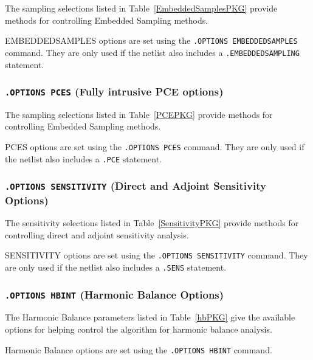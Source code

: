 The sampling selections listed in Table~\ref{EmbeddedSamplesPKG}
provide methods for controlling Embedded Sampling methods.

EMBEDDEDSAMPLES options are set using the \texttt{.OPTIONS EMBEDDEDSAMPLES}
command.  They are only used if the
netlist also includes a \texttt{.EMBEDDEDSAMPLING} statement.



\subsubsection{\texttt{.OPTIONS PCES} (Fully intrusive PCE options)}

The sampling selections listed in Table~\ref{PCEPKG}
provide methods for controlling Embedded Sampling methods.

PCES options are set using the \texttt{.OPTIONS PCES}
command.  They are only used if the
netlist also includes a \texttt{.PCE} statement.



\subsubsection{\texttt{.OPTIONS SENSITIVITY} (Direct and Adjoint Sensitivity Options)}

The sensitivity selections listed in Table~\ref{SensitivityPKG}
provide methods for controlling direct and adjoint sensitivity analysis.

SENSITIVITY options are set using the \texttt{.OPTIONS SENSITIVITY} command. 
They are only used if the netlist also includes a \texttt{.SENS} statement. 



\subsubsection{\texttt{.OPTIONS HBINT} (Harmonic Balance Options)}

The Harmonic Balance parameters listed in Table~\ref{hbPKG} give the available
options for helping control the algorithm for harmonic balance analysis.

Harmonic Balance options are set using the \texttt{.OPTIONS HBINT} command.

